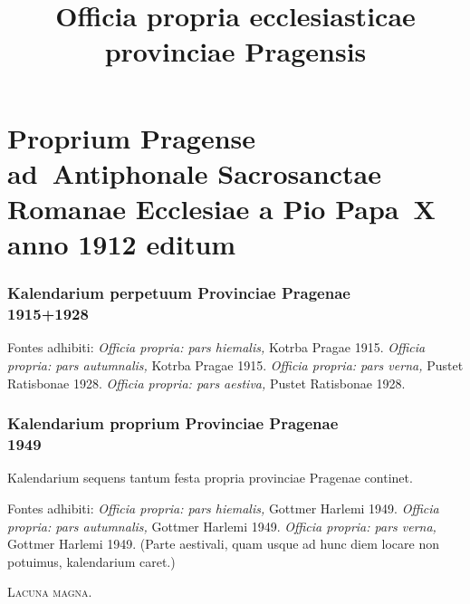 \documentclass[12pt, a5paper, twoside]{book}
\title{Officia propria ecclesiasticae provinciae Pragensis}
\begin{document}
\pagestyle{empty}

\setlength{\parindent}{0.5cm}

\maketitle

\cleardoublepage

\pagestyle{plain}



\part{Proprium Pragense ad~Antiphonale Sacrosanctae Romanae Ecclesiae
  a Pio Papa~X anno 1912 editum}

\section*{Kalendarium perpetuum Provinciae Pragenae\\1915+1928}

{\footnotesize
  Fontes adhibiti:
  \emph{Officia propria: pars hiemalis,} Kotrba Pragae 1915.
  \emph{Officia propria: pars autumnalis,} Kotrba Pragae 1915.
  \emph{Officia propria: pars verna,} Pustet Ratisbonae 1928.
  \emph{Officia propria: pars aestiva,} Pustet Ratisbonae 1928.
}


\cleardoublepage

\section*{Kalendarium proprium Provinciae Pragenae\\1949}

{\footnotesize
  Kalendarium sequens tantum festa propria provinciae Pragenae
  continet.

  Fontes adhibiti:
  \emph{Officia propria: pars hiemalis,} Gottmer Harlemi 1949.
  \emph{Officia propria: pars autumnalis,} Gottmer Harlemi 1949.
  \emph{Officia propria: pars verna,} Gottmer Harlemi 1949.
  (Parte aestivali, quam usque ad hunc diem locare non potuimus,
  kalendarium caret.)
}


\cleardoublepage







\vfill
{\Large \textsc{Lacuna magna.}}
\end{document}
